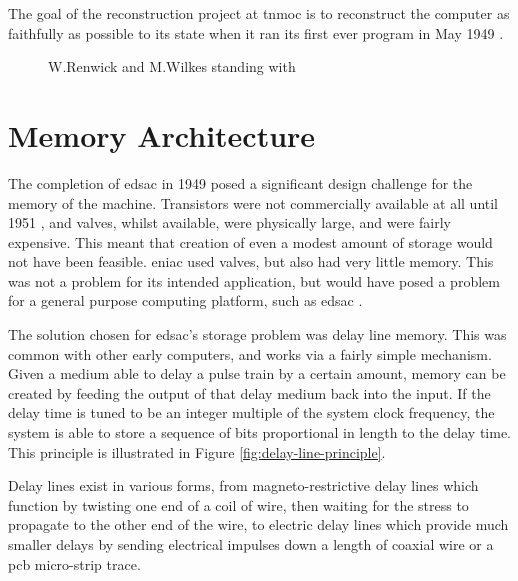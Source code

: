 The goal of the reconstruction project at \gls{tnmoc} is to reconstruct the computer as faithfully as possible to its state when it ran its first ever program in May 1949 \cite{nmoc2017}.


\begin{figure}[ht]
	\centering
	\caption{W.Renwick and M.Wilkes standing with  \cite{cam2011b}}
	\label{fig:edsac-photo}
\end{figure}

\section{ Memory Architecture} \label{sec:edsac-mem-arch}
The completion of \gls{edsac} in 1949 posed a significant design challenge for the memory of the machine. Transistors were not commercially available at all until 1951 \cite{bonne2007}, and valves, whilst available, were physically large, and were fairly expensive. This meant that creation of even a modest amount of storage would not have been feasible. \Gls{eniac} used valves, but also had very little memory. This was not a problem for its intended application, but would have posed a problem for a general purpose computing platform, such as \gls{edsac} \cite[p.208]{wilkes1948}.

The solution chosen for \gls{edsac}'s storage problem was delay line memory. This was common with other early computers, and works via a fairly simple mechanism. Given a medium able to delay a pulse train by a certain amount, memory can be created by feeding the output of that delay medium back into the input. If the delay time is tuned to be an integer multiple of the system clock frequency, the system is able to store a sequence of bits proportional in length to the delay time. This principle is illustrated in Figure \ref{fig:delay-line-principle}.

Delay lines exist in various forms, from magneto-restrictive delay lines which function by twisting one end of a coil of wire, then waiting for the stress to propagate to the other end of the wire, to electric delay lines which provide much smaller delays by sending electrical impulses down a length of coaxial wire or a \gls{pcb} micro-strip trace.

